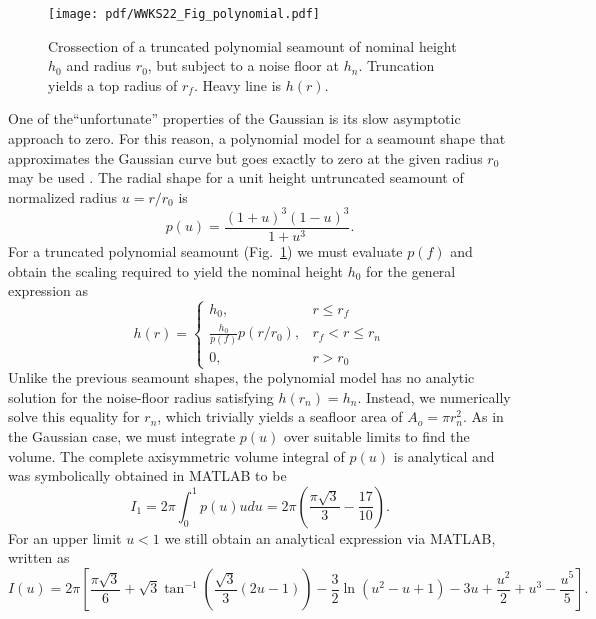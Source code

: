 \begin{figure}[h]
\centering
\texttt{[image: pdf/WWKS22\_Fig\_polynomial.pdf]}
\caption{Crossection of a truncated polynomial seamount of nominal height $h_0$ and radius
$r_0$, but subject to a noise floor at $h_n$.  Truncation yields a top radius of $r_f$. Heavy line is $h(r)$.}
\label{WWKS22_Fig_polynomial}
\end{figure}
One of the``unfortunate'' properties of the Gaussian is its slow asymptotic approach to zero. For this reason,
a polynomial model for a seamount shape that approximates the Gaussian curve but goes exactly to zero at the
given radius $r_0$ may be used \citep[e.g.,~][]{KW2011}.  The radial shape for a unit height untruncated seamount
of normalized radius $u = r/r_0$ is
\begin{equation*}
	p(u) = \frac{(1+u)^3(1-u)^3}{1+u^3}.
\end{equation*}
For a truncated polynomial seamount (Fig.~\ref{WWKS22_Fig_polynomial}) we must evaluate $p(f)$ and obtain the scaling
required to yield the nominal height $h_0$ for the general expression as
\begin{equation*}
h(r) = \left \{ \begin{array}{cl} 
	h_0, & r \leq r_f \\
	\frac{h_0}{p(f)} p(r/r_0), & r_f < r \leq r_n \\
	0, & r > r_0
\end{array} \right.
\end{equation*}
Unlike the previous seamount shapes, the polynomial model has no analytic solution for the noise-floor
radius satisfying $h(r_n) = h_n$.  Instead, we numerically solve this equality for $r_n$, which
trivially yields a seafloor area of $A_o = \pi r_n^2$.
As in the Gaussian case, we must integrate $p(u)$ over suitable limits to find the volume.
The complete axisymmetric volume integral of $p(u)$ is analytical and was symbolically obtained
in MATLAB to be
\begin{equation*}
I_1 = 2\pi\int_0^1 p(u) udu = 2 \pi \left (\frac{\pi \sqrt{3}}{3} - \frac{17}{10} \right ).
\end{equation*}
For an upper limit $u < 1$ we still obtain an analytical expression via MATLAB, written as
\begin{equation*}
	I(u) = 2\pi \left [ \frac{\pi \sqrt{3}}{6} + \sqrt{3} \tan^{-1} \left( \frac{\sqrt{3}}{3}(2u - 1) \right ) - \frac{3}{2}\ln (u^2 - u + 1) - 3u + \frac{u^2}{2} + u^3 - \frac{u^5}{5} \right ].
\end{equation*}
